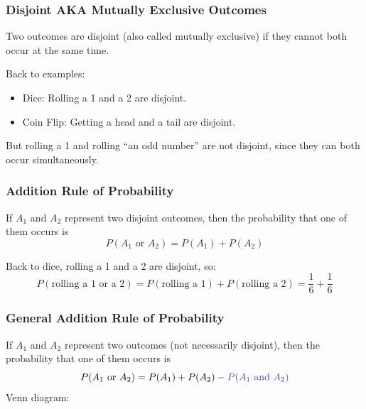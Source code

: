 \documentclass[slides]{beamer}
\newcommand{\blue}[1]{\textcolor{blue2}{#1}}
\begin{document}
\begin{frame}[fragile]
\frametitle{Disjoint AKA Mutually Exclusive Outcomes}
Two outcomes are \blue{disjoint (also called mutually exclusive)} if they cannot both occur at the same time.  

\vspace{0.5cm}

\pause Back to examples:
\begin{itemize}
\pause\item Dice: Rolling a 1 and a 2 are disjoint.  
\pause\item Coin Flip: Getting a head and a tail are disjoint.
\end{itemize}

\vspace{0.5cm}

\pause But rolling a 1 and rolling ``an odd number'' are not disjoint, since they can both occur simultaneously.

\end{frame}


\begin{frame}[fragile]
\frametitle{Addition Rule of Probability}
If $A_1$ and $A_2$ represent two disjoint outcomes, then the probability that one of them occurs is
\[
P(A_1 \mbox{ or } A_2) = P(A_1) + P(A_2)
\]

\vspace{0.5cm}

\pause Back to dice, rolling a 1 and a 2 are disjoint, so:
\[
P(\mbox{rolling a 1 or a 2}) = P(\mbox{rolling a 1}) + P(\mbox{rolling a 2}) = \frac{1}{6} + \frac{1}{6}
\]


\end{frame}



\begin{frame}[fragile]
\frametitle{General Addition Rule of Probability}
If $A_1$ and $A_2$ represent two outcomes (not necessarily disjoint), then the probability that one of them occurs is
\[
P(A_1 \mbox{ or } A_2) = P(A_1) + P(A_2) - \blue{P(A_1 \mbox{ and } A_2)}
\]
Venn diagram:
\vspace{4cm}

\end{frame}
\end{document}
